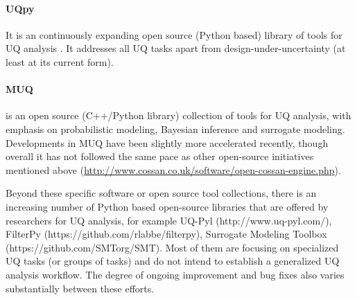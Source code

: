 \paragraph{UQpy} It is an continuously expanding open source (Python based) library of tools for UQ analysis \citep{olivier2020uqpy}. It addresses all UQ tasks apart from design-under-uncertainty (at least at its current form).

\paragraph{MUQ} 
 is an open source (C++/Python library) collection of tools for UQ analysis, with emphasis on probabilistic modeling, Bayesian inference and surrogate modeling. Developments in MUQ have been slightly more accelerated recently, though overall it has not followed the same pace as other open-source initiatives mentioned above (\url{http://www.cossan.co.uk/software/open-cossan-engine.php}).

Beyond these specific software or open source tool collections, there is an increasing number of Python based open-source libraries that are offered by researchers for UQ analysis, for example UQ-Pyl (http://www.uq-pyl.com/), FilterPy (https://github.com/rlabbe/filterpy), Surrogate Modeling Toolbox (https://github.com/SMTorg/SMT). Most of them are focusing on specialized UQ tasks (or groups of tasks) and do not intend to establish a generalized UQ analysis workflow. The degree of ongoing improvement and bug fixes also varies substantially between these efforts. 

